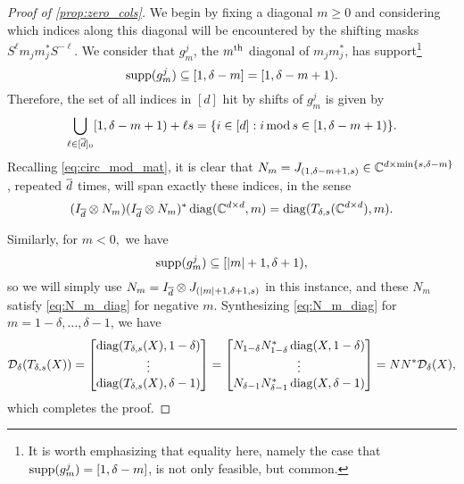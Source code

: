 \begin{proof}[Proof of \cref{prop:zero_cols}]
  We begin by fixing a diagonal $m \ge 0$ and considering which indices along this diagonal will be encountered by the shifting masks $S^\ell m_j m_j^* S^{-\ell}$.  We consider that $g_m^j$, the $m^{\text{th}}$ diagonal of $m_j m_j^*$, has support\footnote{It is worth emphasizing that equality here, namely the case that $\operatorname{supp}(g_m^j) = [1, \delta - m]$, is not only feasible, but common.} \begin{equation}\operatorname{supp}(g_m^j) \subseteq [1, \delta - m] = [1, \delta - m + 1).\label{eq:supp_g_pos}\end{equation}   Therefore, the set of all indices in $[d]$ hit by shifts of $g_m^j$ is given by \[\bigcup_{\ell \in [\overline{d}]_0} [1, \delta - m + 1) + \ell s = \{i \in [d] : i \operatorname{\mathbin{mod}} s \in [1, \delta - m + 1)\}.\]  Recalling \eqref{eq:circ_mod_mat}, it is clear that $N_m = J_{(1, \delta - m + 1, s)} \in \mathbb{C}^{d \times \min\{s, \delta - m\}}$, repeated $\overline{d}$ times, will span exactly these indices, in the sense \begin{equation} \label{eq:N_m_diag} (I_{\overline{d}} \otimes N_m) (I_{\overline{d}} \otimes N_m)^* \operatorname{diag}(\mathbb{C}^{d \times d}, m) = \operatorname{diag}(T_{\delta, s}(\mathbb{C}^{d \times d}), m). \end{equation}

  Similarly, for $m < 0,$ we have \begin{equation} \operatorname{supp}(g_m^j) \subseteq [\lvert m\rvert + 1, \delta + 1), \label{eq:supp_g_neg} \end{equation} so we will simply use $N_m = I_{\overline{d}} \otimes J_{(\lvert m\rvert + 1, \delta + 1, s)}$ in this instance, and these $N_m$ satisfy \eqref{eq:N_m_diag} for negative $m$.  Synthesizing \eqref{eq:N_m_diag} for $m = 1 - \delta, \ldots, \delta - 1$, we have \[\mathcal{D}_\delta(T_{\delta, s}(X)) = \begin{bmatrix} \operatorname{diag}(T_{\delta, s}(X), 1 - \delta) \\ \vdots \\ \operatorname{diag}(T_{\delta, s}(X), \delta - 1) \end{bmatrix} = \begin{bmatrix} N_{1 - \delta} N_{1 - \delta}^* \operatorname{diag}(X, 1 - \delta) \\ \vdots \\ N_{\delta - 1} N_{\delta - 1}^* \operatorname{diag}(X, \delta - 1) \end{bmatrix} = N N^* \mathcal{D}_\delta(X),\] which completes the proof.
\end{proof}

